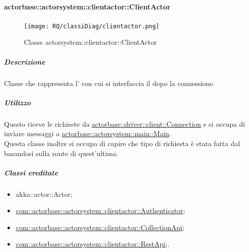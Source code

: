 \documentclass{scalatekids-article}
\begin{document}
\paragraph{actorbase::actorsystem::clientactor::ClientActor}
\label{sec:actorbase::actorsystem::clientactor::ClientActor}

\begin{figure}[H]
   \begin{center}
     \texttt{[image: RQ/classiDiag/clientactor.png]}
     \caption{Classe actorsystem::clientactor::ClientActor}
   \end{center}
 \end{figure}

\subparagraph{Descrizione}

Classe che rappresenta l' con cui si interfaccia il  dopo
la connessione.

\subparagraph{Utilizzo}

Questo  riceve le richieste da \hyperref[sec:actorbase::driver::client::Connection]{actorbase::driver::client::Connection}
e si occupa di inviare messaggi a \hyperref[sec:actorbase::actorsystem::main::Main]{actorbase::actorsystem::main::Main}. \\
Questa classe inoltre si occupa di capire che tipo di richiesta è stata fatta dal  basandosi sulla route di quest'ultima.

\subparagraph{Classi ereditate}

\begin{itemize}

\item akka::actor::Actor;
\item \hyperref[com::actorbase::actorsystem::clientactor::Authenticator]{com::actorbase::actorsystem::clientactor::Authenticator};
\item \hyperref[com::actorbase::actorsystem::clientactor::CollectionApi]{com::actorbase::actorsystem::clientactor::CollectionApi};
\item \hyperref[com::actorbase::actorsystem::clientactor::RestApi]{com::actorbase::actorsystem::clientactor::RestApi};.

\end{itemize}
\end{document}
